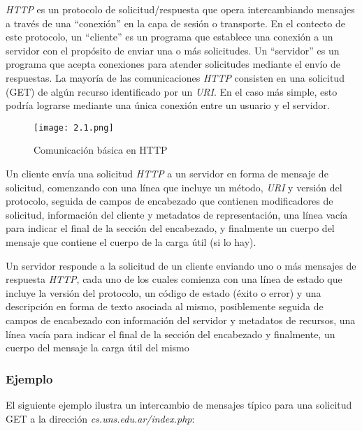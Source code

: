 \emph{HTTP} es un protocolo de solicitud/respuesta que opera intercambiando 
mensajes a través de una ``conexión'' en la capa de sesión o transporte.
En el contecto de este protocolo, un “cliente” es un programa que establece una conexión a un 
 servidor con el propósito de enviar una o más solicitudes. 
 Un “servidor” es un programa que acepta conexiones para
  atender solicitudes mediante el envío de respuestas. 
  La mayoría de las comunicaciones \emph{HTTP} consisten en una solicitud
   (GET) de algún recurso identificado por un \emph{URI}. En el caso más 
   simple, esto podría lograrse mediante una única conexión entre un
    usuario y el servidor.

\begin{center}
   \begin{figure}   
      \begin{center}
         \texttt{[image: 2.1.png]}
      \end{center}
      \caption{Comunicación básica en HTTP}
   \end{figure}
\end{center}

Un cliente envía una solicitud \emph{HTTP} a un servidor en forma de mensaje
 de solicitud, comenzando con una línea que incluye un método, \emph{URI} y 
 versión del protocolo, seguida de campos de encabezado que contienen
  modificadores de solicitud, información del cliente y metadatos de
   representación, una línea vacía para indicar el final de la sección
    del encabezado, y finalmente un cuerpo del mensaje que contiene el 
    cuerpo de la carga útil (si lo hay). 
    
    Un servidor responde a la 
    solicitud de un cliente enviando uno o más mensajes de respuesta 
    \emph{HTTP}, cada uno de los cuales comienza con una línea de estado que 
    incluye la versión del protocolo, un código de estado (éxito o error)
     y una descripción en forma de texto asociada al mismo, posiblemente 
     seguida de campos de encabezado con información del servidor y
      metadatos de recursos, una línea vacía para indicar el final 
      de la sección del encabezado y finalmente, un cuerpo del mensaje
       la carga útil del mismo

\subsubsection*{Ejemplo}
El siguiente ejemplo ilustra un intercambio de mensajes típico 
para una solicitud GET a la dirección \textit{cs.uns.edu.ar/index.php}:

